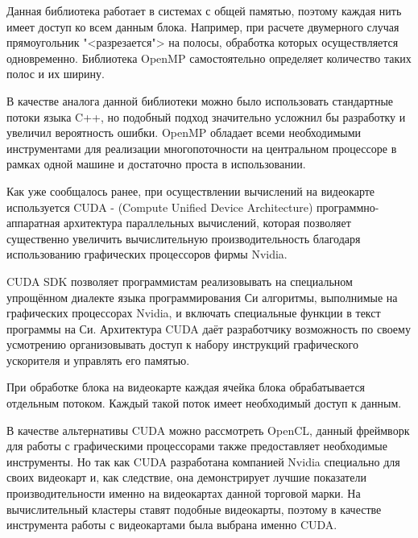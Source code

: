 \documentclass[a4paper, 14pt]{extarticle}
\theoremstyle{definition}
\begin{document}
\par Данная библиотека работает в системах с общей памятью, поэтому каждая нить имеет доступ ко всем данным блока. Например, при расчете двумерного случая прямоугольник "<разрезается"> на полосы, обработка которых осуществляется одновременно. Библиотека OpenMP самостоятельно определяет количество таких полос и их ширину.

\par В качестве аналога данной библиотеки можно было использовать стандартные потоки языка C++, но подобный подход значительно усложнил бы разработку и увеличил вероятность ошибки. OpenMP обладает всеми необходимыми инструментами для реализации многопоточности на центральном процессоре в рамках одной машине и достаточно проста в использовании.


\par Как уже сообщалось ранее, при осуществлении вычислений на видеокарте используется CUDA - (Compute Unified Device Architecture) программно-аппаратная архитектура параллельных вычислений, которая позволяет существенно увеличить вычислительную производительность благодаря использованию графических процессоров фирмы Nvidia.

\par CUDA SDK позволяет программистам реализовывать на специальном упрощённом диалекте языка программирования Си алгоритмы, выполнимые на графических процессорах Nvidia, и включать специальные функции в текст программы на Си. Архитектура CUDA даёт разработчику возможность по своему усмотрению организовывать доступ к набору инструкций графического ускорителя и управлять его памятью.

\par При обработке блока на видеокарте каждая ячейка блока обрабатывается отдельным потоком. Каждый такой поток имеет необходимый доступ к данным.

\par В качестве альтернативы CUDA можно рассмотреть OpenCL, данный фреймворк для работы с графическими процессорами также предоставляет необходимые инструменты. Но так как CUDA разработана компанией Nvidia специально для своих видеокарт и, как следствие, она демонстрирует лучшие показатели производительности именно на видеокартах данной торговой марки. На вычислительный кластеры ставят подобные видеокарты, поэтому в качестве инструмента работы с видеокартами была выбрана именно CUDA.
\end{document}
